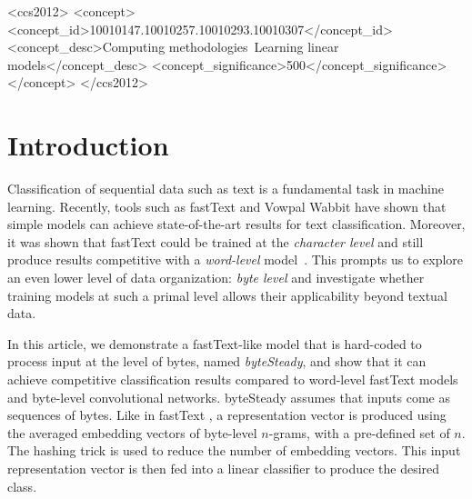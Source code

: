 \documentclass[sigconf,review, anonymous]{acmart}
\begin{document}
\begin{CCSXML}
<ccs2012>
<concept>
<concept_id>10010147.10010257.10010293.10010307</concept_id>
<concept_desc>Computing methodologies~Learning linear models</concept_desc>
<concept_significance>500</concept_significance>
</concept>
</ccs2012>
\end{CCSXML}



\maketitle

\section{Introduction}

Classification of sequential data such as text is a fundamental task in machine learning. Recently, tools such as fastText \cite{JGBM16} and Vowpal Wabbit \cite{WDLSA09} have shown that simple models can achieve state-of-the-art results for text classification. Moreover, it was shown that fastText could be trained at the \emph{character level} and still produce results competitive with a \emph{word-level} model~\cite{ZL17}.
This prompts us to explore an even lower level of data organization: \emph{byte level} and investigate whether training models at such a primal level allows their applicability beyond textual data.

In this article, we demonstrate a fastText-like model that is hard-coded to process input at the level of bytes, named \emph{byteSteady}, and show that it can achieve competitive classification results compared to word-level fastText models and byte-level convolutional networks. byteSteady assumes that inputs come as sequences of bytes. Like in fastText \cite{JGBM16}, a representation vector is produced using the averaged embedding vectors of byte-level \(n\)-grams, with a pre-defined set of \(n\). The hashing trick  \cite{WDLSA09} is used to reduce the number of embedding vectors. This input representation vector is then fed into a linear classifier to produce the desired class.
\end{document}
